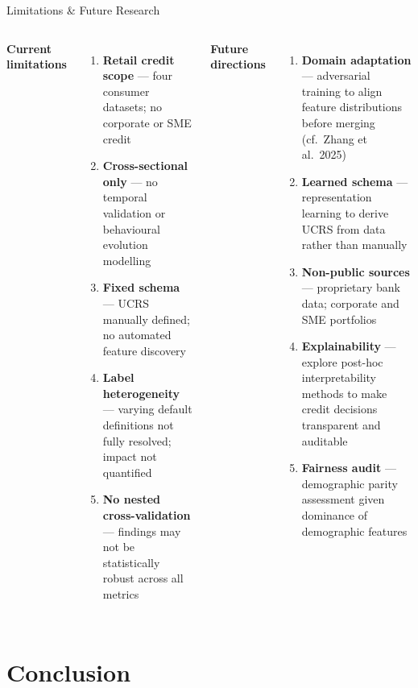 \documentclass[9pt,aspectratio=169]{beamer}
\begin{document}
\begin{frame}{Limitations \& Future Research}
\vspace{-2pt}
\begin{columns}[T]
    \textbf{Current limitations}
    \begin{enumerate}\setlength\itemsep{3pt}
      \item \textbf{Retail credit scope} — four consumer datasets; no
            corporate or SME credit
      \item \textbf{Cross-sectional only} — no temporal validation or
            behavioural evolution modelling
      \item \textbf{Fixed schema} — UCRS manually defined; no automated
            feature discovery
      \item \textbf{Label heterogeneity} — varying default definitions not
            fully resolved; impact not quantified
      \item \textbf{No nested cross-validation} — findings may not be
            statistically robust across all metrics
    \end{enumerate}

    \textbf{Future directions}
    \begin{enumerate}\setlength\itemsep{3pt}
      \item \textbf{Domain adaptation} — adversarial training to align
            feature distributions before merging (cf.\ Zhang et al.\ 2025)
      \item \textbf{Learned schema} — representation learning to derive
            UCRS from data rather than manually
      \item \textbf{Non-public sources} — proprietary bank data; corporate
            and SME portfolios
      \item \textbf{Explainability} — explore post-hoc interpretability
            methods to make credit decisions transparent and auditable
      \item \textbf{Fairness audit} — demographic parity assessment given
            dominance of demographic features
    \end{enumerate}
\end{columns}
\end{frame}

\section{Conclusion}
\end{document}
